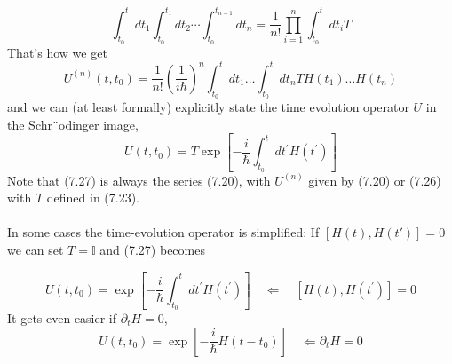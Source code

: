 \begin{equation}
    \int_{t_{0}}^{t} d t_{1} \int_{t_{0}}^{t_{1}} d t_{2} \cdots \int_{t_{0}}^{t_{n-1}} d t_{n}=\frac{1}{n !} \prod_{i=1}^{n} \int_{t_{0}}^{t} d t_{i} T
    \end{equation}
That's how we get
\begin{equation}
    U^{(n)}\left(t, t_{0}\right)=\frac{1}{n !}\left(\frac{1}{i \hbar}\right)^{n} \int_{t_{0}}^{t} d t_{1} \ldots \int_{t_{0}}^{t} d t_{n} T H\left(t_{1}\right) \ldots H\left(t_{n}\right)
    \end{equation}
and we can (at least formally) explicitly state the time evolution operator $U$ in the Schr¨odinger image,
\begin{equation}
    U\left(t, t_{0}\right)=T \exp \left[-\frac{i}{\hbar} \int_{t_{0}}^{t} d t^{\prime} H\left(t^{\prime}\right)\right]
    \end{equation}
Note that (7.27) is always the series (7.20), with $U^{(n)}$ given by (7.20) or (7.26) with $T$ defined in (7.23).\\\\
In some cases the time-evolution operator is simplified: If $[H (t), H (t')] = 0$ we can set $T = \mathbb{I}$ and (7.27) becomes

\begin{equation}
    U\left(t, t_{0}\right)=\exp \left[-\frac{i}{\hbar} \int_{t_{0}}^{t} d t^{\prime} H\left(t^{\prime}\right)\right] \quad \Leftarrow \quad\left[H(t), H\left(t^{\prime}\right)\right]=0
    \end{equation}
It gets even easier if $\partial_tH = 0$,
\begin{equation}
    U\left(t, t_{0}\right)=\exp \left[-\frac{i}{\hbar} H\left(t-t_{0}\right)\right] \quad \Leftarrow \partial_{t} H=0
    \end{equation}
